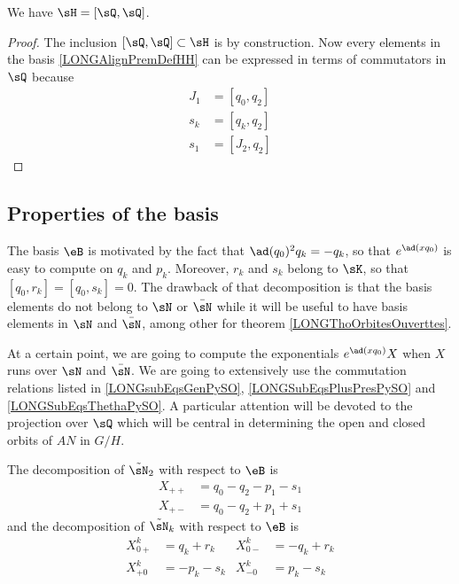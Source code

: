 \begin{proposition}
	We have $\sH=[\sQ,\sQ]$.
\end{proposition}

\begin{proof}
	The inclusion $[\sQ,\sQ]\subset\sH$ is by construction. Now every elements in the basis \eqref{LONGAlignPremDefHH} can be expressed in terms of commutators in $\sQ$ because
	\begin{subequations}
		\begin{align}
			J_1&=[q_0,q_2]\\
			s_k&=[q_k,q_2]\\
			s_1&=[J_2,q_2]	\label{LONGEqJdqdsu}
		\end{align}
	\end{subequations}
\end{proof}

%
\subsection{Properties of the basis}
%


The basis $\eB$ is motivated by the fact that $\ad(q_0)^2q_k=-q_k$, so that $ e^{\ad(xq_0)}$ is easy to compute on $q_k$ and $p_k$. Moreover, $r_k$ and $s_k$ belong to $\sK$, so that $[q_0,r_k]=[q_0,s_k]=0$. The drawback of that decomposition is that the basis elements do not belong to $\sN$ or $\bar\sN$ while it will be useful to have basis elements in $\sN$ and $\bar\sN$, among other for theorem \ref{LONGThoOrbitesOuverttes}. 

At a certain point, we are going to compute the exponentials $ e^{\ad(xq_0)}X$ when $X$ runs over $\sN$ and $\bar\sN$. We are going to extensively use the commutation relations listed in \eqref{LONGsubEqsGenPySO}, \eqref{LONGSubEqsPlusPresPySO} and \eqref{LONGSubEqsThethaPySO}. A particular attention will be devoted to the projection over $\sQ$ which will be central in determining the open and closed orbits of $AN$ in $G/H$.

\begin{lemma}		\label{LONGLemDecomptsNDanseB}
	The decomposition of $\tilde\sN_2$ with respect to $\eB$ is
	\begin{subequations}		\label{LONGSubeqsDecompXqps}
		\begin{align}
			X_{++}&=q_0-q_2-p_1-s_1\\
			X_{+-}&=q_0-q_2+p_1+s_1
		\end{align}
	\end{subequations}
	and the decomposition of $\tilde\sN_k$ with respect to $\eB$ is
	\begin{subequations}
		\begin{align}
			X_{0+}^k & = q_k+r_k	&    X_{0-}^k&=-q_k+r_k		\label{LONGsubEqqrkXzpegal}	\\
			X_{+0}^k & = -p_k-s_k	&	X_{-0}^k & = p_k-s_k
		\end{align}
	\end{subequations}
	
\end{lemma}

